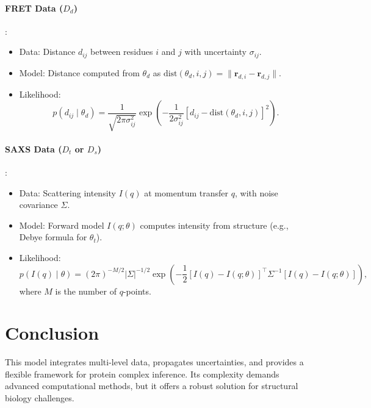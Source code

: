 \documentclass{article}
\begin{document}
\paragraph{FRET Data (\(D_d\))}:
\begin{itemize}
    \item Data: Distance \(d_{ij}\) between residues \(i\) and \(j\) with uncertainty \(\sigma_{ij}\).
    \item Model: Distance computed from \(\theta_d\) as \(\text{dist}(\theta_d, i, j) = \|\mathbf{r}_{d,i} - \mathbf{r}_{d,j}\|\).
    \item Likelihood:
    \[
    p(d_{ij} \mid \theta_d) = \frac{1}{\sqrt{2\pi \sigma_{ij}^2}} \exp\left( -\frac{1}{2\sigma_{ij}^2} \left[ d_{ij} - \text{dist}(\theta_d, i, j) \right]^2 \right).
    \]
\end{itemize}

\paragraph{SAXS Data (\(D_t\) or \(D_s\))}:
\begin{itemize}
    \item Data: Scattering intensity \(I(q)\) at momentum transfer \(q\), with noise covariance \(\Sigma\).
    \item Model: Forward model \(I(q; \theta)\) computes intensity from structure (e.g., Debye formula for \(\theta_t\)).
    \item Likelihood:
    \[
    p(I(q) \mid \theta) = (2\pi)^{-M/2} |\Sigma|^{-1/2} \exp\left( -\frac{1}{2} [I(q) - I(q; \theta)]^\top \Sigma^{-1} [I(q) - I(q; \theta)] \right),
    \]
    where \(M\) is the number of \(q\)-points.
\end{itemize}

\section{Conclusion}
This model integrates multi-level data, propagates uncertainties, and provides a flexible framework for protein complex inference. Its complexity demands advanced computational methods, but it offers a robust solution for structural biology challenges.
\end{document}
